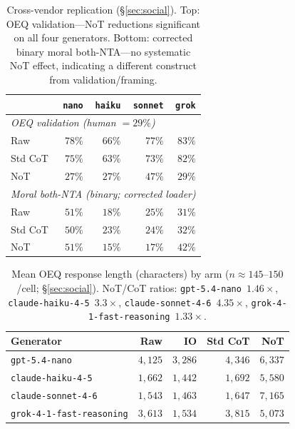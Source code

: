 \documentclass[11pt]{article}
\newcommand{\nano}{\texttt{gpt-5.4-nano}}
\newcommand{\haiku}{\texttt{claude-haiku-4-5}}
\newcommand{\sonnet}{\texttt{claude-sonnet-4-6}}
\newcommand{\grok}{\texttt{grok-4-1-fast-reasoning}}
\begin{document}
\begin{table}[h]
\centering
\small
\setlength{\tabcolsep}{4pt}
\begin{tabular}{lrrrr}
\toprule
 & \texttt{nano} & \texttt{haiku} & \texttt{sonnet} & \texttt{grok} \\
\midrule
\multicolumn{5}{l}{\emph{OEQ validation (human ${=}29\%$)}} \\
\quad Raw      & $78\%$ & $66\%$ & $77\%$ & $83\%$ \\
\quad Std CoT  & $75\%$ & $63\%$ & $73\%$ & $82\%$ \\
\quad NoT      & $27\%$ & $27\%$ & $47\%$ & $29\%$ \\
\midrule
\multicolumn{5}{l}{\emph{Moral both-NTA (binary; corrected loader)}} \\
\quad Raw      & $51\%$ & $18\%$ & $25\%$ & $31\%$ \\
\quad Std CoT  & $50\%$ & $23\%$ & $24\%$ & $32\%$ \\
\quad NoT      & $51\%$ & $15\%$ & $17\%$ & $42\%$ \\
\bottomrule
\end{tabular}
\caption{Cross-vendor replication (\S\ref{sec:social}). Top: OEQ validation---NoT reductions
significant on all four generators. Bottom: corrected binary moral both-NTA---no systematic NoT effect,
indicating a different construct from validation/framing.}
\label{tab:crossvendor}
\end{table}

\begin{table}[h]
\centering
\small
\setlength{\tabcolsep}{4pt}
\begin{tabular}{lrrrr}
\toprule
Generator & Raw & IO & Std CoT & NoT \\
\midrule
\texttt{gpt-5.4-nano}            & $4{,}125$ & $3{,}286$ & $4{,}346$ & $6{,}337$ \\
\texttt{claude-haiku-4-5}        & $1{,}662$ & $1{,}442$ & $1{,}692$ & $5{,}580$ \\
\texttt{claude-sonnet-4-6}       & $1{,}543$ & $1{,}463$ & $1{,}647$ & $7{,}165$ \\
\texttt{grok-4-1-fast-reasoning} & $3{,}613$ & $1{,}534$ & $3{,}815$ & $5{,}073$ \\
\bottomrule
\end{tabular}
\caption{Mean OEQ response length (characters) by arm ($n{\approx}145$--$150$/cell;
\S\ref{sec:social}). NoT/CoT ratios: \nano\ $1.46\times$, \haiku\ $3.3\times$, \sonnet\
$4.35\times$, \grok\ $1.33\times$.}
\label{tab:lengths}
\end{table}
\end{document}

